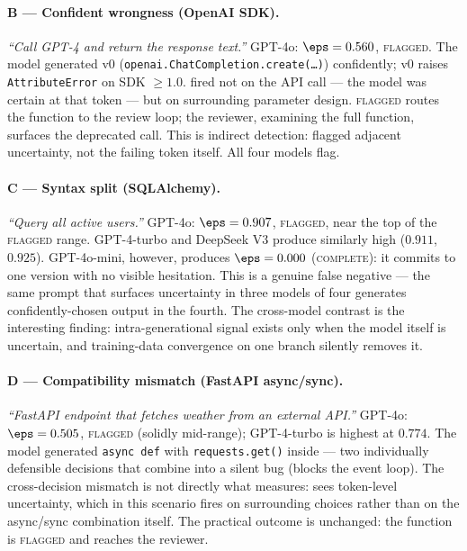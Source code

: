 \paragraph{B --- Confident wrongness (OpenAI SDK).}
\textit{``Call GPT-4 and return the response text.''} GPT-4o: $\eps
= 0.560$, \textsc{flagged}. The model generated v0
(\texttt{openai.ChatCompletion.create(\ldots)}) confidently; v0
raises \texttt{AttributeError} on SDK $\ge 1.0$. \eps fired not on
the API call --- the model was certain at that token --- but on
surrounding parameter design. \textsc{flagged} routes the function
to the review loop; the reviewer, examining the full function,
surfaces the deprecated call. This is indirect detection: \eps
flagged adjacent uncertainty, not the failing token itself. All
four models flag.

\paragraph{C --- Syntax split (SQLAlchemy).}
\textit{``Query all active users.''} GPT-4o: $\eps = 0.907$,
\textsc{flagged}, near the top of the \textsc{flagged} range.
GPT-4-turbo and DeepSeek V3 produce similarly high \eps ($0.911$,
$0.925$). GPT-4o-mini, however, produces $\eps = 0.000$
(\textsc{complete}): it commits to one version with no visible
hesitation. This is a genuine false negative --- the same prompt
that surfaces uncertainty in three models of four generates
confidently-chosen output in the fourth. The cross-model contrast
is the interesting finding: intra-generational signal exists only
when the model itself is uncertain, and training-data convergence
on one branch silently removes it.

\paragraph{D --- Compatibility mismatch (FastAPI async/sync).}
\textit{``FastAPI endpoint that fetches weather from an external
API.''} GPT-4o: $\eps = 0.505$, \textsc{flagged} (solidly mid-range);
GPT-4-turbo is highest at $0.774$. The model generated
\texttt{async def} with \texttt{requests.get()} inside --- two
individually defensible decisions that combine into a silent bug
(blocks the event loop). The cross-decision mismatch is not
directly what \eps measures: \eps sees token-level uncertainty,
which in this scenario fires on surrounding choices rather than on
the async/sync combination itself. The practical outcome is
unchanged: the function is \textsc{flagged} and reaches the reviewer.

